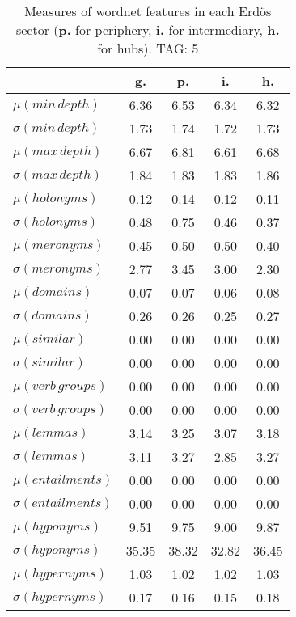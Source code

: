 \begin{table}[h!]
\begin{center}
\begin{tabular}{| l || c | c | c | c |}\hline
 & {\bf g.} & {\bf p.} & {\bf i.} & {\bf h.} \\\hline\hline
$\mu(min\,depth)$ & 6.36  & 6.53  & 6.34  & 6.32 \\
$\sigma(min\,depth)$ & 1.73  & 1.74  & 1.72  & 1.73 \\\hline
$\mu(max\,depth)$ & 6.67  & 6.81  & 6.61  & 6.68 \\
$\sigma(max\,depth)$ & 1.84  & 1.83  & 1.83  & 1.86 \\\hline
$\mu(holonyms)$ & 0.12  & 0.14  & 0.12  & 0.11 \\
$\sigma(holonyms)$ & 0.48  & 0.75  & 0.46  & 0.37 \\\hline
$\mu(meronyms)$ & 0.45  & 0.50  & 0.50  & 0.40 \\
$\sigma(meronyms)$ & 2.77  & 3.45  & 3.00  & 2.30 \\\hline
$\mu(domains)$ & 0.07  & 0.07  & 0.06  & 0.08 \\
$\sigma(domains)$ & 0.26  & 0.26  & 0.25  & 0.27 \\\hline
$\mu(similar)$ & 0.00  & 0.00  & 0.00  & 0.00 \\
$\sigma(similar)$ & 0.00  & 0.00  & 0.00  & 0.00 \\\hline
$\mu(verb\,groups)$ & 0.00  & 0.00  & 0.00  & 0.00 \\
$\sigma(verb\,groups)$ & 0.00  & 0.00  & 0.00  & 0.00 \\\hline
$\mu(lemmas)$ & 3.14  & 3.25  & 3.07  & 3.18 \\
$\sigma(lemmas)$ & 3.11  & 3.27  & 2.85  & 3.27 \\\hline
$\mu(entailments)$ & 0.00  & 0.00  & 0.00  & 0.00 \\
$\sigma(entailments)$ & 0.00  & 0.00  & 0.00  & 0.00 \\\hline
$\mu(hyponyms)$ & 9.51  & 9.75  & 9.00  & 9.87 \\
$\sigma(hyponyms)$ & 35.35  & 38.32  & 32.82  & 36.45 \\\hline
$\mu(hypernyms)$ & 1.03  & 1.02  & 1.02  & 1.03 \\
$\sigma(hypernyms)$ & 0.17  & 0.16  & 0.15  & 0.18 \\\hline
\end{tabular}
\caption{Measures of wordnet features in each Erd\"os sector ({{\bf p.}} for periphery, {{\bf i.}} for intermediary, {{\bf h.}} for hubs). TAG: 5}
\end{center}
\end{table}
